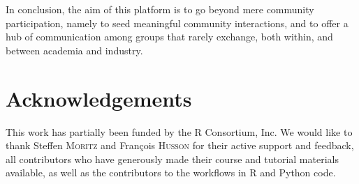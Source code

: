 In conclusion, the aim of this platform is to go beyond mere community participation, namely to seed meaningful community interactions, and to offer a hub of communication among groups that rarely exchange, both within, and between academia and industry. %



\section{Acknowledgements}
This work has partially been funded by the R Consortium, Inc. We would like to thank Steffen \textsc{Moritz} and Fran\c{c}ois \textsc{Husson} for their active support and feedback, all contributors who have generously made their course and tutorial materials available, as well as the contributors to the workflows in {R} and {Python} code.





\newpage

